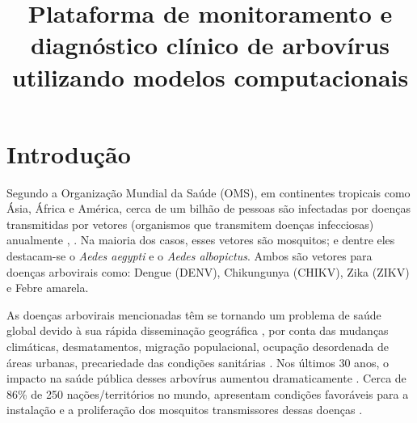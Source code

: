 \documentclass[12pt]{article}
\title{Plataforma de monitoramento e diagnóstico clínico de arbovírus utilizando modelos computacionais}
\begin{document}
 

\maketitle

     


\section{Introdução}

Segundo a Organização Mundial da Saúde (OMS), em continentes tropicais como Ásia, África e América, cerca de um bilhão de pessoas são infectadas por doenças transmitidas por vetores (organismos que transmitem doenças infecciosas) anualmente \cite{PAPER04}, \cite{PAPER01}. Na maioria dos casos, esses vetores são mosquitos; e dentre eles destacam-se o \textit{Aedes aegypti} e o \textit{Aedes albopictus}. Ambos são vetores para doenças arbovirais como: Dengue (DENV), Chikungunya (CHIKV), Zika (ZIKV) e Febre amarela.

As doenças arbovirais mencionadas têm se tornando um problema de saúde global devido à sua rápida disseminação geográfica \cite{PAPER01}, por conta das mudanças climáticas, desmatamentos, migração populacional, ocupação desordenada de áreas urbanas, precariedade das condições sanitárias \cite{PAPER05}. Nos últimos 30 anos, o impacto na saúde pública desses arbovírus aumentou dramaticamente \cite{PAPER01}. Cerca de 86\% de 250 nações/territórios no mundo, apresentam condições favoráveis para a instalação e a proliferação dos mosquitos transmissores dessas doenças \cite{PAPER01}.
\end{document}
